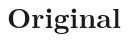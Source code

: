 \documentclass[main.tex]{subfiles}
\begin{document}
\section{Original} \label{section:impl_original}
\end{document}
